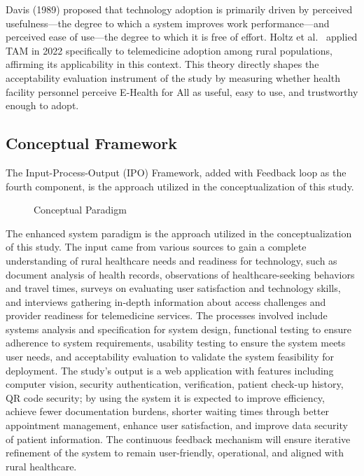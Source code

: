 \documentclass{research}
\begin{document}
Davis (1989) proposed that technology adoption is primarily driven by perceived usefulness---the
degree to which a system improves work performance---and perceived ease of use---the degree to
which it is free of effort. Holtz et al.\ \cite{Holtz2022} applied TAM in 2022 specifically to
telemedicine adoption among rural populations, affirming its applicability in this context. This
theory directly shapes the acceptability evaluation instrument of the study by measuring whether
health facility personnel perceive E-Health for All as useful, easy to use, and trustworthy
enough to adopt.

\subsection*{Conceptual Framework}

The Input-Process-Output (IPO) Framework, added with Feedback loop as the fourth component, is
the approach utilized in the conceptualization of this study.

\begin{figure}[H]
  \centering
  \caption{Conceptual Paradigm}
  \label{fig:conceptual}
\end{figure}

The enhanced system paradigm is the approach utilized in the conceptualization of this study. The
input came from various sources to gain a complete understanding of rural healthcare needs and
readiness for technology, such as document analysis of health records, observations of
healthcare-seeking behaviors and travel times, surveys on evaluating user satisfaction and
technology skills, and interviews gathering in-depth information about access challenges and
provider readiness for telemedicine services. The processes involved include systems analysis and
specification for system design, functional testing to ensure adherence to system requirements,
usability testing to ensure the system meets user needs, and acceptability evaluation to validate
the system feasibility for deployment. The study's output is a web application with features
including computer vision, security authentication, verification, patient check-up history, QR
code security; by using the system it is expected to improve efficiency, achieve fewer
documentation burdens, shorter waiting times through better appointment management, enhance user
satisfaction, and improve data security of patient information. The continuous feedback mechanism
will ensure iterative refinement of the system to remain user-friendly, operational, and aligned
with rural healthcare.
\end{document}
